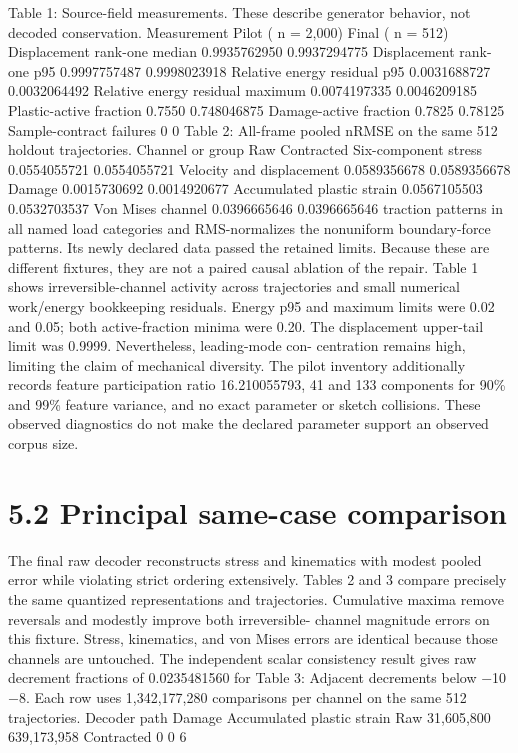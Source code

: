 \documentclass[11pt]{article}
\begin{document}
Table 1: Source-field measurements. These describe generator behavior, not decoded conservation.
Measurement Pilot ( n = 2,000) Final ( n = 512)
Displacement rank-one median 0.9935762950 0.9937294775
Displacement rank-one p95 0.9997757487 0.9998023918
Relative energy residual p95 0.0031688727 0.0032064492
Relative energy residual maximum 0.0074197335 0.0046209185
Plastic-active fraction 0.7550 0.748046875
Damage-active fraction 0.7825 0.78125
Sample-contract failures 0 0
Table 2: All-frame pooled nRMSE on the same 512 holdout trajectories.
Channel or group Raw Contracted
Six-component stress 0.0554055721 0.0554055721
Velocity and displacement 0.0589356678 0.0589356678
Damage 0.0015730692 0.0014920677
Accumulated plastic strain 0.0567105503 0.0532703537
Von Mises channel 0.0396665646 0.0396665646
traction patterns in all named load categories and RMS-normalizes the nonuniform boundary-force
patterns. Its newly declared data passed the retained limits. Because these are different fixtures,
they are not a paired causal ablation of the repair.
Table 1 shows irreversible-channel activity across trajectories and small numerical work/energy
bookkeeping residuals. Energy p95 and maximum limits were 0.02 and 0.05; both active-fraction
minima were 0.20. The displacement upper-tail limit was 0.9999. Nevertheless, leading-mode con-
centration remains high, limiting the claim of mechanical diversity. The pilot inventory additionally
records feature participation ratio 16.210055793, 41 and 133 components for 90\% and 99\% feature
variance, and no exact parameter or sketch collisions. These observed diagnostics do not make the
declared parameter support an observed corpus size.

\section*{5.2 Principal same-case comparison}

The final raw decoder reconstructs stress and kinematics with modest pooled error while violating
strict ordering extensively. Tables 2 and 3 compare precisely the same quantized representations
and trajectories. Cumulative maxima remove reversals and modestly improve both irreversible-
channel magnitude errors on this fixture. Stress, kinematics, and von Mises errors are identical
because those channels are untouched.
The independent scalar consistency result gives raw decrement fractions of 0.0235481560 for
Table 3: Adjacent decrements below \ensuremath{-}10\ensuremath{-}8. Each row uses 1,342,177,280 comparisons per channel
on the same 512 trajectories.
Decoder path Damage Accumulated plastic strain
Raw 31,605,800 639,173,958
Contracted 0 0
6
\end{document}
